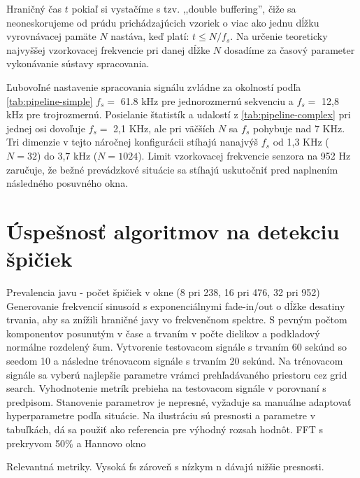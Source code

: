 Hraničný čas $t$ pokiaľ si vystačíme s tzv. ,,double buffering'', čiže sa neoneskorujeme od prúdu prichádzajúcich vzoriek o viac ako jednu
dĺžku vyrovnávacej pamäte $N$ nastáva, keď platí: $t \leq N / f_s$. Na určenie teoreticky najvyššej vzorkovacej frekvencie
pri danej dĺžke $N$ dosadíme za časový parameter vykonávanie sústavy spracovania.

Ľubovoľné nastavenie spracovania signálu zvládne za okolností podľa \ref{tab:pipeline-simple} $f_s =$ 61.8 kHz pre jednorozmernú
sekvenciu a $f_s =$ 12,8 kHz pre trojrozmernú. Posielanie štatistík a udalostí z \ref{tab:pipeline-complex} pri jednej osi
dovoľuje $f_s =$ 2,1 KHz, ale pri väčších $N$ sa $f_s$ pohybuje nad 7 KHz. Tri dimenzie v tejto náročnej konfigurácii stíhajú nanajvýš $f_s$
od 1,3 KHz ($N = 32$) do 3,7 kHz ($N = 1024$). Limit vzorkovacej frekvencie senzora na 952 Hz zaručuje, že bežné prevádzkové
situácie sa stíhajú uskutočniť pred naplnením následného posuvného okna.

\section{Úspešnosť algoritmov na detekciu špičiek}

Prevalencia javu - počet špičiek v okne (8 pri 238, 16 pri 476, 32 pri 952)
Generovanie frekvencií sinusoíd s exponenciálnymi fade-in/out o dĺžke desatiny trvania, aby sa znížili hraničné javy vo frekvenčnom spektre. S pevným počtom komponentov posunutým v čase a trvaním v počte dielikov a podkladový normálne rozdelený šum.
Vytvorenie testovacom signále s trvaním 60 sekúnd
so seedom 10 a následne trénovacom signále s trvaním 20 sekúnd. Na trénovacom signále sa vyberú najlepšie parametre
vrámci prehľadávaného priestoru cez grid search. Vyhodnotenie metrík prebieha na testovacom signále v porovnaní s predpisom.
Stanovenie parametrov je nepresné, vyžaduje sa manuálne adaptovať hyperparametre podľa situácie. Na ilustráciu
sú presnosti a parametre v tabuľkách, dá sa použiť ako referencia pre výhodný rozsah hodnôt. FFT s prekryvom 50\% a Hannovo okno

Relevantná metriky. Vysoká fs zároveň s nízkym n dávajú nižšie presnosti.

